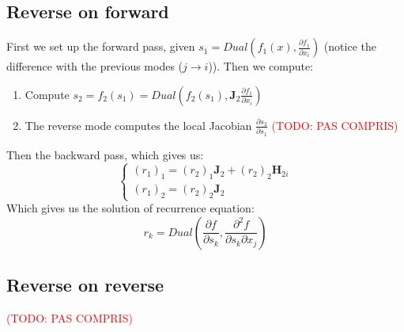 \documentclass[12pt, openany]{report}
\newcommand{\J}{\mathbf{J}}
\newcommand{\He}{\mathbf{H}}
\theoremstyle{definition}
\begin{document}
\subsection{Reverse on forward}
First we set up the forward pass, given $s_1 = Dual(f_1(x), \frac{\partial f_1}{\partial x_i })$ (notice the difference with the previous modes ($j \to i$)). Then we compute:
\begin{enumerate}
  \item Compute $s_2 = f_2(s_1) = Dual(f_2(s_1), \J_2 \frac{\partial f_1}{\partial x_i})$
  \item The reverse mode computes the local Jacobian $\frac{\partial s_2}{\partial s_1}$ \textcolor{red}{(TODO: PAS COMPRIS)}
\end{enumerate}
Then the backward pass, which gives us:
\begin{equation}
  \begin{cases}
    (r_1)_1 = (r_2)_1 \J_2 + (r_2)_2 \He_{2i}\\
    (r_1)_2 = (r_2)_2 \J_2
  \end{cases}
\end{equation}
Which gives us the solution of recurrence equation:
\begin{equation}
  r_k = Dual(\frac{\partial f}{\partial s_k}, \frac{\partial^2 f}{\partial s_k \partial x_j})
\end{equation}
\subsection{Reverse on reverse}
\textcolor{red}{(TODO: PAS COMPRIS)}
\end{document}
